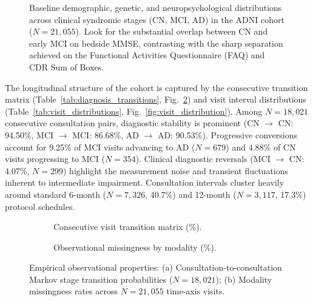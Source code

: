 \documentclass[11pt,a4paper]{article}
\begin{document}
\begin{figure}[t]
\centering
{}
\caption{Baseline demographic, genetic, and neuropsychological distributions across clinical syndromic stages (CN, MCI, AD) in the ADNI cohort ($N = 21,055$). Look for the substantial overlap between CN and early MCI on bedside MMSE, contrasting with the sharp separation achieved on the Functional Activities Questionnaire (FAQ) and CDR Sum of Boxes.}
\label{fig:baseline_characteristics}
\end{figure}




The longitudinal structure of the cohort is captured by the consecutive transition matrix (Table~\ref{tab:diagnosis_transitions}, Fig.~\ref{fig:diagnosis_transitions}) and visit interval distributions (Table~\ref{tab:visit_distributions}, Fig.~\ref{fig:visit_distribution}). Among $N = 18,021$ consecutive consultation pairs, diagnostic stability is prominent (CN $\to$ CN: 94.50\%, MCI $\to$ MCI: 86.68\%, AD $\to$ AD: 90.53\%). Progressive conversions account for 9.25\% of MCI visits advancing to AD ($N = 679$) and 4.88\% of CN visits progressing to MCI ($N = 354$). Clinical diagnostic reversals (MCI $\to$ CN: 4.07\%, $N = 299$) highlight the measurement noise and transient fluctuations inherent to intermediate impairment. Consultation intervals cluster heavily around standard 6-month ($N = 7,326$, 40.7\%) and 12-month ($N = 3,117$, 17.3\%) protocol schedules.

\begin{figure}[t]
\centering
\begin{subfigure}[t]{0.48\linewidth}
    \centering
    \caption{Consecutive visit transition matrix (\%).}
    \label{fig:diagnosis_transitions}
\end{subfigure}
\hfill
\begin{subfigure}[t]{0.48\linewidth}
    \centering
    \caption{Observational missingness by modality (\%).}
    \label{fig:missingness_by_modality}
\end{subfigure}
\caption{Empirical observational properties: (a) Consultation-to-consultation Markov stage transition probabilities ($N = 18,021$); (b) Modality missingness rates across $N = 21,055$ time-axis visits.}
\label{fig:transitions_and_missingness}
\end{figure}
\end{document}
